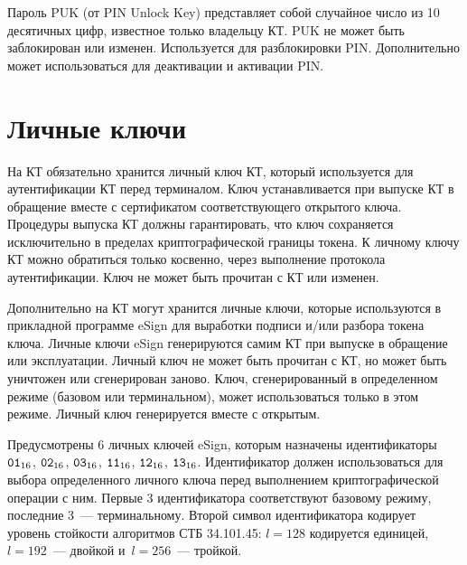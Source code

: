 Пароль PUK (от PIN Unlock Key) представляет собой случайное число из 10 
десятичных цифр, известное только владельцу КТ. PUK не может быть заблокирован 
или изменен. Используется для разблокировки PIN. Дополнительно может использоваться 
для деактивации и активации PIN.

\section{Личные ключи}\label{OBJ.Keys}

На КТ обязательно хранится личный ключ КТ, который используется 
для аутентификации КТ перед терминалом. Ключ устанавливается при выпуске
КТ в обращение вместе с сертификатом соответствующего открытого ключа. 
Процедуры выпуска КТ должны гарантировать, что ключ сохраняется исключительно 
в пределах криптографической границы токена. К личному ключу КТ можно 
обратиться только косвенно, через выполнение протокола аутентификации. Ключ не 
может быть прочитан с КТ или изменен. 

Дополнительно на КТ могут хранится личные ключи, 
которые используются в прикладной программе eSign для выработки 
подписи и/или разбора токена ключа. Личные ключи eSign генерируются самим КТ 
при выпуске в обращение или эксплуатации. Личный ключ не может быть прочитан с КТ, 
но может быть уничтожен или сгенерирован заново. Ключ, сгенерированный в 
определенном режиме (базовом или терминальном), может использоваться только в 
этом режиме. Личный ключ генерируется вместе с открытым.

Предусмотрены 6 личных ключей eSign, которым назначены идентификаторы 
$\texttt{01}_{16}$, $\texttt{02}_{16}$, $\texttt{03}_{16}$, $\texttt{11}_{16}$, $\texttt{12}_{16}$, $\texttt{13}_{16}$.
%
Идентификатор должен использоваться для выбора определенного личного ключа 
перед выполнением криптографической операции с ним.
%
Первые 3 идентификатора соответствуют базовому режиму, последние 3~--- 
терминальному. Второй символ идентификатора кодирует уровень стойкости
алгоритмов СТБ 34.101.45: $l=128$ кодируется единицей, 
$l=192$~--- двойкой и~$l=256$~--- тройкой.


